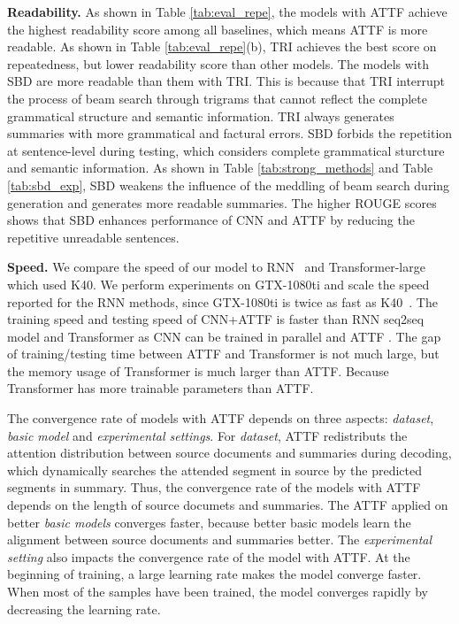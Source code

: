 \documentclass{nle}
\theoremstyle{definition}
\newcommand{\tabref}[1]{Table \ref{#1}}
\begin{document}
\textbf{Readability.}
As shown in \tabref{tab:eval_repe}, 
the models with ATTF achieve the
highest readability score among all baselines, 
which means ATTF is more readable.
As shown in \tabref{tab:eval_repe}(b),
TRI achieves the best score on repeatedness, 
but lower readability score than other models.
The models with SBD are more readable than them with TRI. 
This is because that TRI interrupt the process of beam search through trigrams that cannot reflect the complete grammatical structure and semantic information. 
TRI always generates summaries with more grammatical and factural errors. 
SBD forbids the repetition at sentence-level during testing, which considers complete grammatical sturcture and semantic information.
As shown in \tabref{tab:strong_methods} and \tabref{tab:sbd_exp}, SBD weakens the influence of the meddling of beam search during generation
and generates more readable summaries.
The higher ROUGE scores shows that SBD enhances performance of CNN and ATTF by reducing the repetitive unreadable sentences. 

\textbf{Speed.} 
We compare the speed of our model to RNN~\citep{SeeLM17} and Transformer-large~\citep{Attn17}
which used K40. 
We perform experiments on GTX-1080ti and scale the speed 
reported for the RNN methods,
since GTX-1080ti is twice as fast as K40~\citep{gehring2017convs2s}.
The training speed and testing speed of CNN+ATTF 
is faster than RNN seq2seq model and Transformer
as CNN can be trained in parallel and ATTF .
The gap of training/testing time between ATTF and Transformer is not much large,
but the memory usage of Transformer is much larger than ATTF.
Because Transformer has more trainable parameters than ATTF.

The convergence rate of models with ATTF depends on three aspects:
{\em dataset}, {\em basic model} and {\em experimental settings}.
For {\em dataset}, ATTF redistributs the attention distribution between source documents and summaries during decoding,
which dynamically searches the attended segment in source by the predicted segments in summary.
Thus, the convergence rate of the models with ATTF depends on the length of source documets and summaries.
The ATTF applied on better {\em basic models} converges faster,
because better basic models learn the alignment between source documents and summaries better.
The {\em experimental setting} also impacts the convergence rate of the model with ATTF.
At the beginning of training, a large learning rate makes the model converge faster. 
When most of the samples have been trained, 
the model converges rapidly by decreasing the learning rate.
\end{document}
